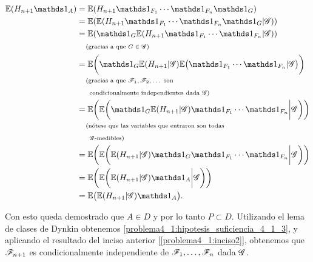 \begin{align}
    \E(H_{n+1} \indic_A)    &=  \E(H_{n+1} \indic_{F_1} \cdots \indic_{F_n} \indic_{G})                                                     \\ 
                            &=  \E(\E(H_{n+1} \indic_{F_1} \cdots \indic_{F_n} \indic_{G} | \G))                                            \\ 
                            &=  \E(\indic_{G} \E(H_{n+1} \indic_{F_1} \cdots \indic_{F_n} | \G))                                            \\
                            &\comment{gracias a que $G \in \G$}                                                                             \\
                            &=  \E\bigg(\indic_{G} \E(H_{n+1} | \G) \E\big(\indic_{F_1} \cdots \indic_{F_n} | \G\big)\bigg)                 \\
                            &\lcomment{gracias a que $\F_1, \F_2, \dots$ son}                                                               \\
                            &\rcomment{condicionalmente independientes dada $\G$}                                                           \\
                            &=  \E\bigg(\E\bigg( \indic_{G} \E(H_{n+1} | \G) \indic_{F_1} \cdots \indic_{F_n} \bigg| \G\bigg)\bigg)         \\
                            &\lcomment{nótese que las variables que entraron son todas}                                                     \\
                            &\rcomment{$\G$-medibles}                                                                                       \\
                            &=  \E\bigg(\E\bigg( \E(H_{n+1} | \G) \indic_{G} \indic_{F_1} \cdots \indic_{F_n} \bigg| \G\bigg)\bigg)         \\
                            &=  \E\bigg(\E\bigg( \E(H_{n+1} | \G) \indic_{A} \bigg| \G\bigg)\bigg)                                          \\
                            &=  \E\big( \E(H_{n+1} | \G) \indic_{A} \big).
\end{align}\pn

Con esto queda demostrado que $A \in D$ y por lo tanto $P \subset D$. Utilizando el lema de clases de Dynkin obtenemos
\eqref{problema4_1:hipotesis_suficiencia_4_1_3}, y aplicando el resultado del inciso anterior [\ref{problema4_1:inciso2}],
obtenemos que $\mathscr{F}_{n+1}$ es condicionalmente independiente de $\mathscr{F}_1, \dots, \mathscr{F}_n$ dada $\mathscr{G}$.\pn



